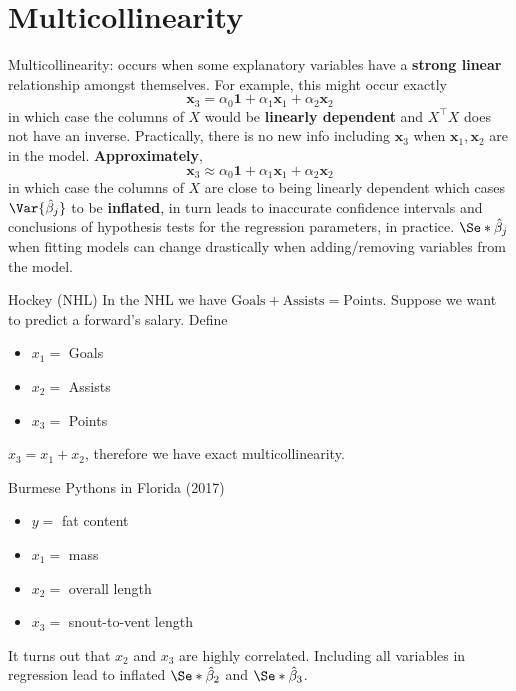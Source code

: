 \section{Multicollinearity}
Multicollinearity: occurs when some explanatory
variables have a \textbf{strong linear}
relationship amongst themselves. For example,
this might occur exactly
\[ \symbf{x}_3=\alpha_0\symbf{1}+\alpha_1\symbf{x}_1+\alpha_2\symbf{x}_2 \]
in which case the columns of $ X $ would be \textbf{linearly dependent}
and $ X^\top X $ does not have an inverse. Practically,
there is no new info including $ \symbf{x}_3 $
when $ \symbf{x}_1,\symbf{x}_2 $ are in the model.
\textbf{Approximately},
\[ \symbf{x}_3\approx \alpha_0\symbf{1}+\alpha_1\symbf{x}_1+\alpha_2\symbf{x}_2 \]
in which case the columns of $ X $ are close to being
linearly dependent which cases $ \Var{\hat{\beta}_j} $
to be \textbf{inflated}, in turn leads to inaccurate confidence
intervals and conclusions of hypothesis tests
for the regression parameters, in practice.
$ \Se*{\hat{\beta}_j} $ when fitting models can change drastically
when adding/removing variables from the model.

\begin{Example}{Hockey (NHL)}{}
  In the NHL we have $ \text{Goals}+\text{Assists}=\text{Points} $.
  Suppose we want to predict a forward's salary. Define
  \begin{itemize}
    \item $ x_1= $ Goals
    \item $ x_2= $ Assists
    \item $ x_3= $ Points
  \end{itemize}
  $ x_3=x_1+x_2 $, therefore we have exact multicollinearity.
\end{Example}
\begin{Example}{Burmese Pythons in Florida (2017)}{}
  \begin{itemize}
    \item $ y= $ fat content
    \item $ x_1= $ mass
    \item $ x_2= $ overall length
    \item $ x_3= $ snout-to-vent length
  \end{itemize}
  It turns out that $ x_2 $ and $ x_3 $ are highly
  correlated. Including all variables in
  regression lead to inflated $ \Se*{\hat{\beta}_2} $
  and $ \Se*{\hat{\beta}_3} $.
\end{Example}

